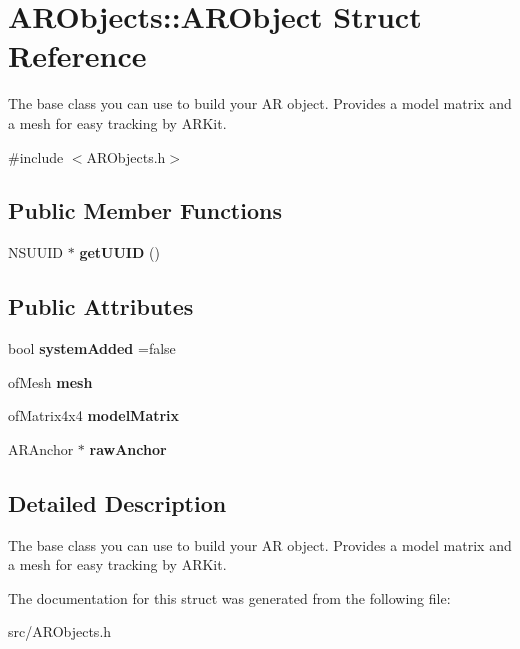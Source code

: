 \hypertarget{struct_a_r_objects_1_1_a_r_object}{}\section{A\+R\+Objects\+:\+:A\+R\+Object Struct Reference}
\label{struct_a_r_objects_1_1_a_r_object}


The base class you can use to build your AR object. Provides a model matrix and a mesh for easy tracking by A\+R\+Kit.  




{\ttfamily \#include $<$A\+R\+Objects.\+h$>$}

\subsection*{Public Member Functions}
\begin{DoxyCompactItemize}
\item 
\mbox{\label{struct_a_r_objects_1_1_a_r_object_a7b8bd58c0431abebd9cf97a32fc27fab}} 
N\+S\+U\+U\+ID $\ast$ {\bfseries get\+U\+U\+ID} ()
\end{DoxyCompactItemize}
\subsection*{Public Attributes}
\begin{DoxyCompactItemize}
\item 
\mbox{\label{struct_a_r_objects_1_1_a_r_object_abb84b8f934ab23b396cc1904ba5c5569}} 
bool {\bfseries system\+Added} =false
\item 
\mbox{\label{struct_a_r_objects_1_1_a_r_object_a32c91c54c8ca0981e234603211372b88}} 
of\+Mesh {\bfseries mesh}
\item 
\mbox{\label{struct_a_r_objects_1_1_a_r_object_ab77100dc107d550499f7c7fd5403c0ef}} 
of\+Matrix4x4 {\bfseries model\+Matrix}
\item 
\mbox{\label{struct_a_r_objects_1_1_a_r_object_a50fb9ac03adddf5d00783c7e10c8e1d8}} 
A\+R\+Anchor $\ast$ {\bfseries raw\+Anchor}
\end{DoxyCompactItemize}


\subsection{Detailed Description}
The base class you can use to build your AR object. Provides a model matrix and a mesh for easy tracking by A\+R\+Kit. 

The documentation for this struct was generated from the following file\+:\begin{DoxyCompactItemize}
\item 
src/A\+R\+Objects.\+h\end{DoxyCompactItemize}
